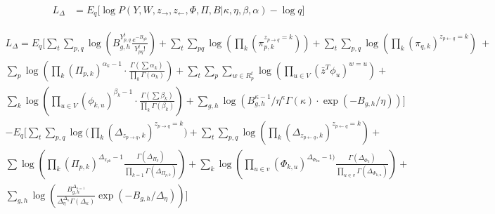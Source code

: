 \begin{align}
L_{\Delta} &= E_{q}\bigg[ \log \! P(Y, W, z_{\rightarrow}, z_{\leftarrow}, \Phi,
\Pi, B | \kappa, \eta, \beta, \alpha) - \log \! q \bigg]
\end{align}

\begin{eqnarray}
L_{\Delta} = E_{q} \Bigg[ \sum_{t} \! \sum_{p,q} \! \log \left(
B_{g,h}^{Y_{p,q}^t} \frac{e^{-B_{gh}}}{Y_{pq}^{t}!} \right) +
\sum_{t} \! \sum_{pq} \! \log\left( \prod_{k} (\pi_{p,k}^{z_{p \rightarrow q} =
k}) \right) + \sum_{t} \! \sum_{p,q} \log \! \left( \prod_{k}(\pi_{q,k})^{z_{p
\leftarrow q} = k} \right) ~+ \nonumber\\
 \sum_{p} \! \log \left( \prod_{k}
(\Pi_{p,k})^{\alpha_{k} - 1} \cdot \frac{\Gamma(\sum \alpha_{k})}{\prod_{k}
\Gamma(\alpha_{k})} \right) +
\sum_{t} \! \sum_{p} \! \sum_{w\in R_p^t}  \log \! \left(
\prod_{u\in V}(\bar{z}^T\phi_u)^{w = u} \right) + \nonumber\\
 \sum_{k} \! \log\left( \prod_{u\in V}
(\phi_{k,u})^{\beta_{k} - 1} \cdot \frac{\Gamma(\sum \beta_{k})}{\prod_{k}
\Gamma(\beta_{k})} \right) +
 \sum_{g,h} \! \log \! \left( B_{g,h}^{\kappa - 1} /
\eta^{\kappa} \Gamma(\kappa) \cdot \exp(-B_{g,h}/\eta) \right) \Bigg]
\nonumber\\
% 
 -E_{q} \Bigg[ \sum_{t} \! \sum_{p,q} \log \big( \prod_{k} (\Delta_{z_{p
\rightarrow q}, k})^{z_{p \rightarrow q}=k} \big) + \sum_{t} \! \sum_{p,q}
\! \log \! \left(
\prod_{k} \! (\Delta_{z_{p \leftarrow q}, k})^{z_{p \leftarrow q} = k} \right)
 + \nonumber \\
 \sum \! \log \left( \prod_{k} \! (\Pi_{p,k})^{\Delta_{\pi_{pk}}-1}
\frac{\Gamma(\Delta_{\Pi_{p}})}{\prod_{k=1} \! \Gamma(\Delta_{\Pi_{p,k}})}
\right) + 
\sum_{k} \log \! \left( \prod_{u \in v}
(\Phi_{k,u})^{\Delta_{\Phi_{ku}} - 1)} \frac{\Gamma(\Delta_{\Phi_{k}})}
{\prod_{u \in v} \! \Gamma(\Delta_{\Phi_{k,u}})} \right) + \nonumber \\ 
\sum_{g,h} \log \! \left(
\frac{B_{g,h}^{\Delta_{\kappa = 1}}}{\Delta_{\eta}^{\Delta_{\kappa}}
\Gamma(\Delta_{\kappa})} \exp(-B_{g,h}/\Delta_{\eta}) \right) \Bigg]
\label{eqn:VarLowerBound}
\end{eqnarray}


